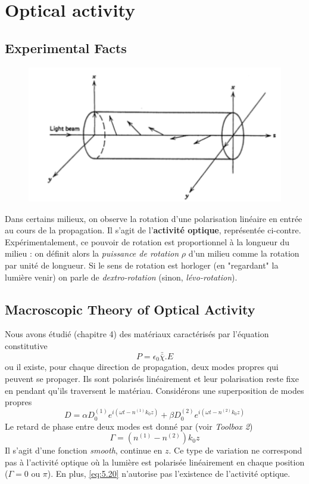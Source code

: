 \section{Optical activity}
\subsection{Experimental Facts}
	\begin{figure}
	\vspace{-8mm}
	\includegraphics[scale=0.3]{ch5/image3}
	\end{figure}
Dans certains milieux, on observe la rotation d'une polarisation linéaire en entrée au cours de 
la propagation. Il s'agit de l'\textbf{activité optique}, représentée ci-contre. Expérimentalement,
ce pouvoir de rotation est proportionnel à la longueur du milieu : on définit alors la \textit{puissance
de rotation} $\rho$ d'un milieu comme la rotation par unité de longueur. Si le sens de rotation est
horloger (en "regardant" la lumière venir) on parle de \textit{dextro-rotation} (sinon, \textit{
lévo-rotation}).

\newpage
\subsection{Macroscopic Theory of Optical Activity}
Nous avons étudié (chapitre 4) des matériaux caractérisés par l'équation constitutive
\begin{equation}
P =\epsilon_0\bar{\bar{\chi}}.E
\label{eq:5.20}
\end{equation}
ou il existe, pour chaque direction de propagation, deux modes propres qui peuvent se
propager. Ils sont polarisés linéairement et leur polarisation reste fixe en pendant qu'ils 
traversent le matériau.  Considérons une superposition de modes propres
\begin{equation}
D = \alpha D_0^{(1)}e^{i(\omega t-n^{(1)}k_0z)}+\beta D_0^{(2)}e^{i(\omega t-n^{(2)}k_0z)}
\end{equation}
Le retard de phase entre deux modes est donné par (voir \textit{Toolbox 2})
\begin{equation}
\Gamma = (n^ {(1)}-n^ {(2)})k_0z
\end{equation}
Il s'agit d'une fonction \textit{smooth}, continue en $z$. Ce type de variation ne correspond
pas à l'activité optique où la lumière est polarisée linéairement en chaque position ($\Gamma=
0$ ou $\pi$). En plus, \eqref{eq:5.20} n'autorise pas l'existence de l'activité optique. \\

